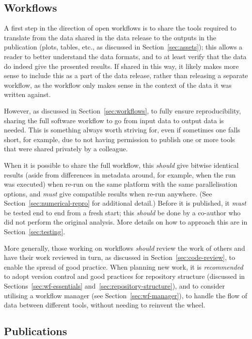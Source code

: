 \documentclass{article}
\newcommand\rfcword[1]{\emph{#1}\xspace}
\newcommand\must{\rfcword{must}}
\newcommand\should{\rfcword{should}}
\newcommand\recommended{\rfcword{recommended}}
\begin{document}
\subsection{Workflows}

A first step in the direction of open workflows
is to share the tools required to translate
from the data shared in the data release
to the outputs in the publication
(plots, tables, etc.,
as discussed in Section~\ref{sec:assets});
this allows a reader to better understand the data formats,
and to at least verify that the data do indeed give the presented results.
If shared in this way,
it likely makes more sense to include this as a part of the data release,
rather than releasing a separate workflow,
as the workflow only makes sense in the context of the data it was written against.

However,
as discussed in Section~\ref{sec:workflows},
to fully ensure reproducibility,
sharing the full software workflow to go from input data to output data is needed.
This is something always worth striving for,
even if sometimes one falls short,
for example,
due to not having permission to publish
one or more tools that were shared privately by a colleague.

When it is possible to share the full workflow,
this \should give bitwise identical results
(aside from differences in metadata around,
for example,
when the run was executed)
when re-run on the same platform with the same parallelisation options,
and \must give compatible results when re-run anywhere.
(See Section~\ref{sec:numerical-repro} for additional detail.)
Before it is published,
it \must be tested end to end from a fresh start;
this \should be done by a co-author who did not perform the original analysis.
More details on how to approach this are in Section~\ref{sec:testing}.

More generally,
those working on workflows \should review the work of others
and have their work reviewed in turn,
as discussed in Section~\ref{sec:code-review},
to enable the spread of good practice.
When planning new work,
it is \recommended to adopt version control and good practices for repository structure
(discussed in Sections~\ref{sec:wf-essentials} and~\ref{sec:repository-structure}),
and to consider utilising a workflow manager
(see Section~\ref{sec:wf-manager}),
to handle the flow of data between different tools,
without needing to reinvent the wheel.

\subsection{Publications}
\end{document}
